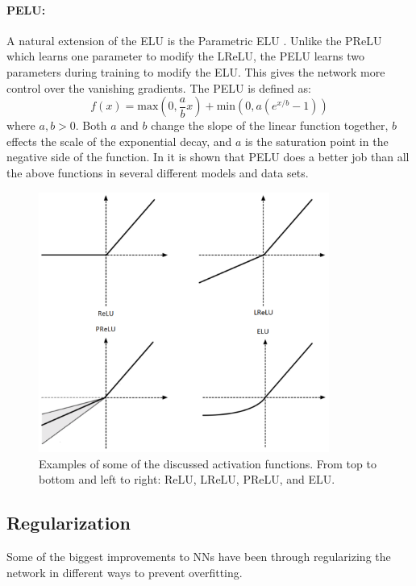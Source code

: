 \paragraph{PELU:}
A natural extension of the ELU is the Parametric ELU \cite{trottier2016parametric}. Unlike the PReLU which learns one parameter to modify the LReLU, the PELU learns two parameters during training to modify the ELU. This gives the network more control over the vanishing gradients. The PELU is defined as:
\begin{equation}
f(x) = \mbox{max}(0,\frac{a}{b}x) + \mbox{min}(0,a(e^{x/b}-1))
\label{e:pelu}
\end{equation}
where $a,b > 0$. Both $a$ and $b$ change the slope of the linear function together, $b$ effects the scale of the exponential decay, and $a$ is the saturation point in the negative side of the function. In \cite{trottier2016parametric} it is shown that PELU does a better job than all the above functions in several different models and data sets.

\begin{figure}[h!]
	\centering
		\includegraphics[width=0.85\textwidth]{figures/activations.png}
	\caption{Examples of some of the discussed activation functions. From top to bottom and left to right: ReLU, LReLU, PReLU, and ELU. \cite{}}
	\label{f:activations}
\end{figure}


\subsection{Regularization}
Some of the biggest improvements to NNs have been through regularizing the network in different ways to prevent overfitting.

